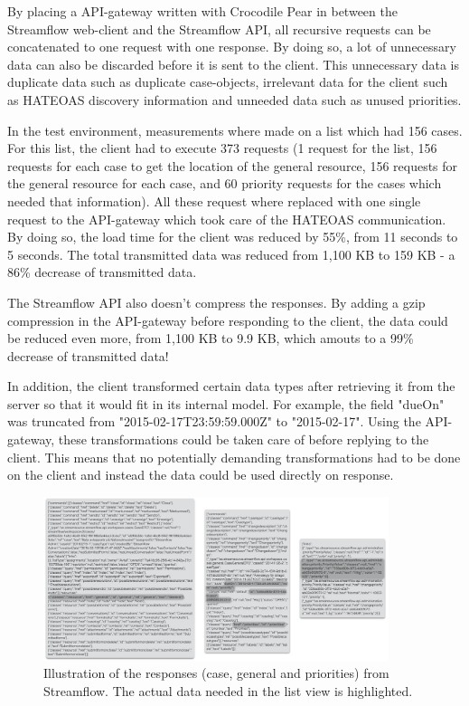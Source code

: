 \documentclass{cslthse-msc}
\begin{document}
By placing a API-gateway written with Crocodile Pear in between the Streamflow web-client and the Streamflow API, all recursive requests can be concatenated to one request with one response. By doing so, a lot of unnecessary data can also be discarded before it is sent to the client. This unnecessary data is duplicate data such as duplicate case-objects, irrelevant data for the client such as HATEOAS discovery information and unneeded data such as unused priorities.

In the test environment, measurements where made on a list which had 156 cases. For this list, the client had to execute 373 requests (1 request for the list, 156 requests for each case to get the location of the general resource, 156 requests for the general resource for each case, and 60 priority requests for the cases which needed that information). All these request where replaced with one single request to the API-gateway which took care of the HATEOAS communication. By doing so, the load time for the client was reduced by 55\%, from 11 seconds to 5 seconds. The total transmitted data was reduced from 1,100 KB to 159 KB - a 86\% decrease of transmitted data.

The Streamflow API also doesn't compress the responses. By adding a gzip compression in the API-gateway before responding to the client, the data could be reduced even more, from 1,100 KB to 9.9 KB, which amouts to a 99\% decrease of transmitted data!

In addition, the client transformed certain data types after retrieving it from the server so that it would fit in its internal model. For example, the field "dueOn" was truncated from "2015-02-17T23:59:59.000Z" to "2015-02-17". Using the API-gateway, these transformations could be taken care of before replying to the client. This means that no potentially demanding transformations had to be done on the client and instead the data could be used directly on response.

\begin{figure}[H]
  \centering
    \begin{center}
      \includegraphics[width=0.9\textwidth]{images/streamflow_response.png}
    \end{center}
  \caption{Illustration of the responses (case, general and priorities) from Streamflow. The actual data needed in the list view is highlighted.}
\end{figure}
\end{document}
